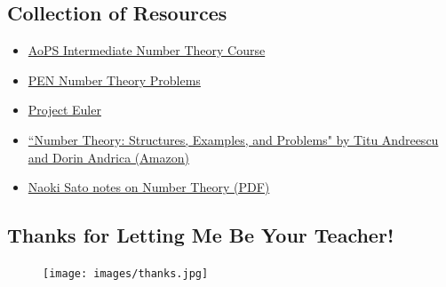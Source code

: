 \clearpage

\subsection{Collection of Resources}
\begin{itemize}
	\item \href{http://artofproblemsolving.com/school/course/catalog/intermediate-numbertheory}{AoPS Intermediate Number Theory Course}
	\item \href{http://www.artofproblemsolving.com/community/c3210_pen_problems}{PEN Number Theory Problems}
	\item \href{https://projecteuler.net/}{Project Euler}
	\item \href{https://www.amazon.com/Number-Theory-Structures-Examples-Problems/dp/081763245X}{``Number Theory: Structures, Examples, and Problems" by Titu Andreescu and Dorin Andrica (Amazon)}
	\item \href{http://artofproblemsolving.com/articles/files/SatoNT.pdf}{Naoki Sato notes on Number Theory (PDF)}
\end{itemize}

\subsection{Thanks for Letting Me Be Your Teacher!}
\begin{figure}[h]
	\centering\texttt{[image: images/thanks.jpg]}
\end{figure}

\clearpage
\thispagestyle{empty} %



\clearpage






